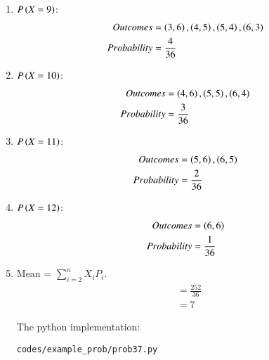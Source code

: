 \begin{enumerate}
\item $P\left(X=9\right)$:
\begin{align}
Outcomes  &= \left(3,6\right), \left(4,5\right), \left(5,4\right), \left(6,3\right)\\
Probability &= \frac{4}{36}
\end{align}

\item $P\left(X=10\right)$:
\begin{align}
Outcomes  &= \left(4,6\right), \left(5,5\right), \left(6,4\right)\\
Probability &= \frac{3}{36}
\end{align}

\item $P\left(X=11\right)$:
\begin{align}
Outcomes  &= \left(5,6\right), \left(6,5\right)\\
Probability &= \frac{2}{36}
\end{align}

\item $P\left(X=12\right)$:
\begin{align}
Outcomes  &= \left(6,6\right) \\
Probability &= \frac{1}{36}
\end{align}


\item Mean  = $\sum^n_{i=2} X_iP_i$.
\begin{align}
&= \frac{252}{36}\\
&= 7
\end{align}

The python implementation:
\begin{lstlisting}
codes/example_prob/prob37.py
\end{lstlisting}

\end{enumerate}